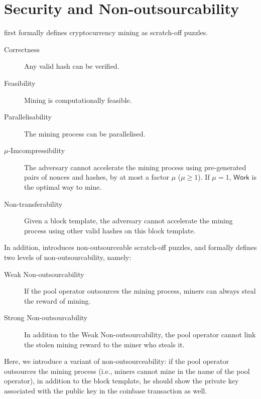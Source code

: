 \section{Security and Non-outsourcability}


\cite{miller2015nonoutsourceable} first formally defines cryptocurrency mining as scratch-off puzzles. 

\begin{description}
    \item[Correctness] Any valid hash can be verified.
    \item[Feasibility] Mining is computationally feasible.
    \item[Parallelisability] The mining process can be parallelised.
    \item[$\mu$-Imcompressibility] The adversary cannot accelerate the mining process using pre-generated pairs of nonces and hashes, by at most a factor $\mu$ ($\mu \geq 1$). If $\mu = 1$, $\mathsf{Work}$ is the optimal way to mine.
    \item[Non-transferability] Given a block template, the adversary cannot accelerate the mining process using other valid hashes on this block template.
\end{description}

In addition, \cite{miller2015nonoutsourceable} introduces non-outsourceable scratch-off puzzles, and formally defines two levels of non-outsourcability, namely:

\begin{description}
    \item[Weak Non-outsourcability] If the pool operator outsources the mining process, miners can always steal the reward of mining.
    \item[Strong Non-outsourcability] In addition to the Weak Non-outsourcability, the pool operator cannot link the stolen mining reward to the miner who steals it.
\end{description}



Here, we introduce a variant of non-outsourceability: if the pool operator outsources the mining process (i.e., miners cannot mine in the name of the pool operator), in addition to the block template, he should show the private key associated with the public key in the coinbase transaction as well.

